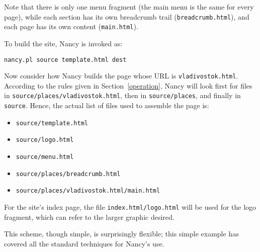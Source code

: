 \documentclass[english]{scrartcl}
\begin{document}
Note that there is only one menu fragment (the main menu is the same for every page), while each section has its own breadcrumb trail (\verb|breadcrumb.html|), and each page has its own content (\verb|main.html|).

To build the site, Nancy is invoked as:

\begin{verbatim}
nancy.pl source template.html dest
\end{verbatim}

Now consider how Nancy builds the page whose URL is \verb|vladivostok.html|. According to the rules given in Section~\ref{operation}, Nancy will look first for files in \verb|source/places/vladivostok.html|, then in \verb|source/places|, and finally in \verb|source|. Hence, the actual list of files used to assemble the page is:

\begin{itemize}
\item \verb|source/template.html|
\item \verb|source/logo.html|
\item \verb|source/menu.html|
\item \verb|source/places/breadcrumb.html|
\item \verb|source/places/vladivostok.html/main.html|
\end{itemize}

For the site's index page, the file \verb|index.html/logo.html| will be used for the logo fragment, which can refer to the larger graphic desired.

This scheme, though simple, is surprisingly flexible; this simple example has covered all the standard techniques for Nancy's use.
\end{document}
